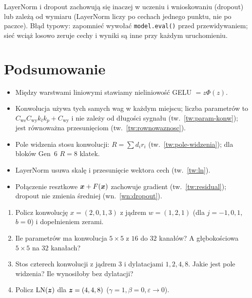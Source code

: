\begin{pulapka}
LayerNorm i dropout zachowują się inaczej w uczeniu i wnioskowaniu (dropout) lub zależą od wymiaru (LayerNorm liczy po cechach jednego punktu, nie po paczce). Błąd typowy: zapomnieć wywołać \texttt{model.eval()} przed przewidywaniem; sieć wciąż losowo zeruje cechy i wyniki są inne przy każdym uruchomieniu.
\end{pulapka}

\section*{Podsumowanie}
\begin{itemize}
\item Między warstwami liniowymi stawiamy nieliniowość GELU $=z\Phi(z)$.
\item Konwolucja używa tych samych wag w każdym miejscu; liczba parametrów to $C_\mathrm{we}C_\mathrm{wy}k_tk_p+C_\mathrm{wy}$ i nie zależy od długości sygnału (tw.~\ref{tw:param-konw}); jest równoważna przesunięciom (tw.~\ref{tw:rownowaznosc}).
\item Pole widzenia stosu konwolucji: $R=\sum d_ir_i$ (tw.~\ref{tw:pole-widzenia}); dla bloków Gen~6 $R=8$ klatek.
\item LayerNorm usuwa skalę i przesunięcie wektora cech (tw.~\ref{tw:ln}).
\item Połączenie resztkowe $\bm{x}+F(\bm{x})$ zachowuje gradient (tw.~\ref{tw:residual}); dropout nie zmienia średniej (wn.~\ref{wn:dropout}).
\end{itemize}

\begin{sprawdz}
\begin{enumerate}
\item Policz konwolucję $x=(2,0,1,3)$ z jądrem $w=(1,2,1)$ (dla $j=-1,0,1$, $b=0$) i dopełnieniem zerami.
\item Ile parametrów ma konwolucja $5\times5$ z $16$ do $32$ kanałów? A głębokościowa $5\times5$ na $32$ kanałach?
\item Stos czterech konwolucji z jądrem $3$ i dylatacjami $1,2,4,8$. Jakie jest pole widzenia? Ile wynosiłoby bez dylatacji?
\item Policz $\operatorname{LN}(\bm{z})$ dla $\bm{z}=(4,4,8)$ ($\gamma=1,\beta=0,\varepsilon\to0$).
\end{enumerate}
\end{sprawdz}

